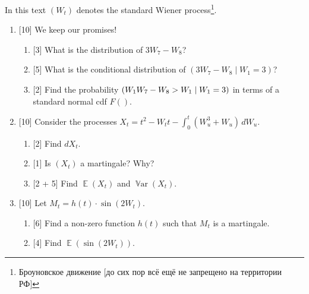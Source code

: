 \documentclass[12pt]{article}
\DeclareMathOperator{\Var}{\mathbb{V}ar}
\let\P\relax
\DeclareMathOperator{\P}{\mathbb{P}}
\DeclareMathOperator{\E}{\mathbb{E}}
\begin{document}
In this text $(W_t)$ denotes the standard Wiener process\footnote{Броуновское движение [до сих пор всё ещё не запрещено на территории РФ]}.


\begin{enumerate}
    \item {[10]} We keep our promises! 
    \begin{enumerate}
        \item {[3]} What is the distribution of $3W_7 - W_8$? 
        \item {[5]} What is the conditional distribution of $(3W_7 - W_8 \mid W_1 = 3)$?
        \item {[2]} Find the probability $\P(W_1 W_7 - W_8 > W_1 \mid W_1 = 3)$ in terms of a standard normal cdf $F()$.
    \end{enumerate}


    \item {[10]} Consider the processes $X_t = t^2 -  W_t t - \int_0^t (W_u^3 + W_u) \, dW_u$.
    \begin{enumerate}
        \item {[2]} Find $dX_t$.
        \item {[1]} Is $(X_t)$ a martingale? Why?
        \item {[2 + 5]} Find $\E(X_t)$ and $\Var(X_t)$.
    \end{enumerate}


    \item {[10]} Let $M_t = h(t) \cdot \sin (2W_t)$.
    \begin{enumerate}
        \item {[6]} Find a non-zero function $h(t)$ such that $M_t$ is a martingale.
        \item {[4]} Find $\E(\sin (2W_t))$.
    \end{enumerate}



    

\end{enumerate}
\end{document}
